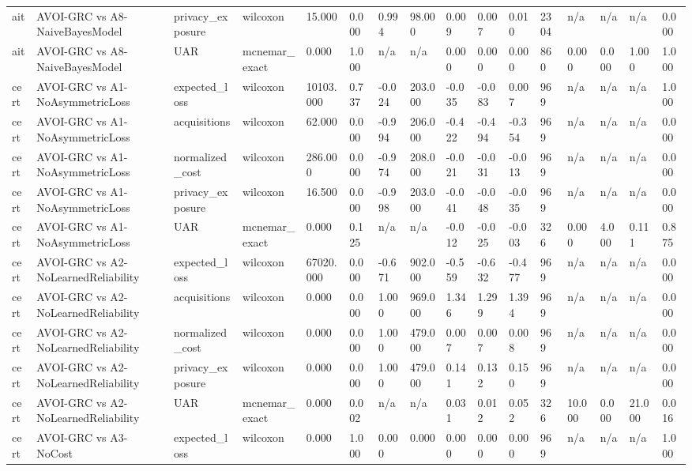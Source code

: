 \begin{table}[!ht]
{\begin{tabular}{llllllllllllllll}
ait & AVOI-GRC vs A8-NaiveBayesModel & privacy\_exposure & wilcoxon & 15.000 & 0.000 & 0.994 & 98.000 & 0.009 & 0.007 & 0.010 & 2304 & n/a & n/a & n/a & 0.000 \\
ait & AVOI-GRC vs A8-NaiveBayesModel & UAR & mcnemar\_exact & 0.000 & 1.000 & n/a & n/a & 0.000 & 0.000 & 0.000 & 860 & 0.000 & 0.000 & 1.000 & 1.000 \\
cert & AVOI-GRC vs A1-NoAsymmetricLoss & expected\_loss & wilcoxon & 10103.000 & 0.737 & -0.024 & 203.000 & -0.035 & -0.083 & 0.007 & 969 & n/a & n/a & n/a & 1.000 \\
cert & AVOI-GRC vs A1-NoAsymmetricLoss & acquisitions & wilcoxon & 62.000 & 0.000 & -0.994 & 206.000 & -0.422 & -0.494 & -0.354 & 969 & n/a & n/a & n/a & 0.000 \\
cert & AVOI-GRC vs A1-NoAsymmetricLoss & normalized\_cost & wilcoxon & 286.000 & 0.000 & -0.974 & 208.000 & -0.021 & -0.031 & -0.013 & 969 & n/a & n/a & n/a & 0.000 \\
cert & AVOI-GRC vs A1-NoAsymmetricLoss & privacy\_exposure & wilcoxon & 16.500 & 0.000 & -0.998 & 203.000 & -0.041 & -0.048 & -0.035 & 969 & n/a & n/a & n/a & 0.000 \\
cert & AVOI-GRC vs A1-NoAsymmetricLoss & UAR & mcnemar\_exact & 0.000 & 0.125 & n/a & n/a & -0.012 & -0.025 & -0.003 & 326 & 0.000 & 4.000 & 0.111 & 0.875 \\
cert & AVOI-GRC vs A2-NoLearnedReliability & expected\_loss & wilcoxon & 67020.000 & 0.000 & -0.671 & 902.000 & -0.559 & -0.632 & -0.477 & 969 & n/a & n/a & n/a & 0.000 \\
cert & AVOI-GRC vs A2-NoLearnedReliability & acquisitions & wilcoxon & 0.000 & 0.000 & 1.000 & 969.000 & 1.346 & 1.299 & 1.394 & 969 & n/a & n/a & n/a & 0.000 \\
cert & AVOI-GRC vs A2-NoLearnedReliability & normalized\_cost & wilcoxon & 0.000 & 0.000 & 1.000 & 479.000 & 0.007 & 0.007 & 0.008 & 969 & n/a & n/a & n/a & 0.000 \\
cert & AVOI-GRC vs A2-NoLearnedReliability & privacy\_exposure & wilcoxon & 0.000 & 0.000 & 1.000 & 479.000 & 0.141 & 0.132 & 0.150 & 969 & n/a & n/a & n/a & 0.000 \\
cert & AVOI-GRC vs A2-NoLearnedReliability & UAR & mcnemar\_exact & 0.000 & 0.002 & n/a & n/a & 0.031 & 0.012 & 0.052 & 326 & 10.000 & 0.000 & 21.000 & 0.016 \\
cert & AVOI-GRC vs A3-NoCost & expected\_loss & wilcoxon & 0.000 & 1.000 & 0.000 & 0.000 & 0.000 & 0.000 & 0.000 & 969 & n/a & n/a & n/a & 1.000 \\

\end{tabular}}
\end{table}
